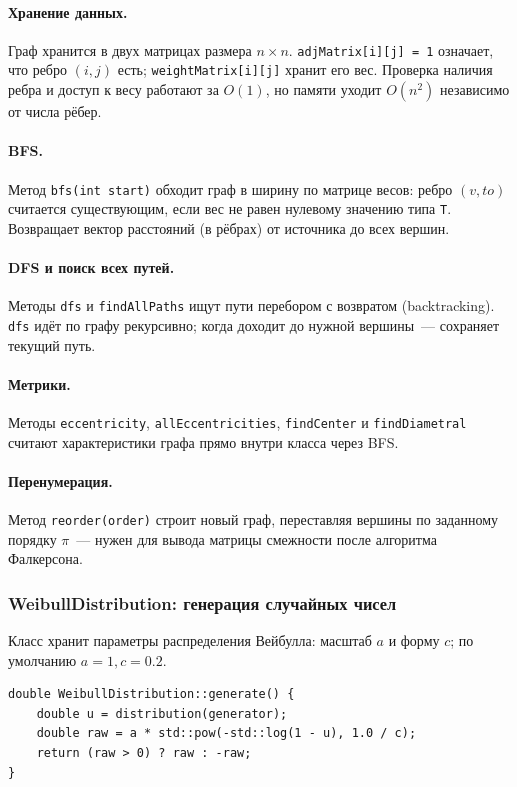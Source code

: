 \paragraph{Хранение данных.} Граф хранится в двух матрицах размера $n \times n$.
\texttt{adjMatrix[i][j] = 1} означает, что ребро $(i, j)$ есть;
\texttt{weightMatrix[i][j]} хранит его вес.
Проверка наличия ребра и доступ к весу работают за $O(1)$, но памяти
уходит $O(n^2)$ независимо от числа рёбер.

\paragraph{BFS.} Метод \texttt{bfs(int start)} обходит граф в ширину
по матрице весов: ребро $(v, to)$ считается существующим, если вес не равен
нулевому значению типа \texttt{T}. Возвращает вектор расстояний (в рёбрах)
от источника до всех вершин.

\paragraph{DFS и поиск всех путей.} Методы \texttt{dfs} и
\texttt{findAllPaths} ищут пути перебором с возвратом (backtracking).
\texttt{dfs} идёт по графу рекурсивно; когда доходит до нужной вершины~---
сохраняет текущий путь.

\paragraph{Метрики.} Методы \texttt{eccentricity}, \texttt{allEccentricities},
\texttt{findCenter} и \texttt{findDiametral} считают характеристики графа
прямо внутри класса через BFS.

\paragraph{Перенумерация.} Метод \texttt{reorder(order)} строит новый граф,
переставляя вершины по заданному порядку $\pi$~--- нужен для вывода матрицы
смежности после алгоритма Фалкерсона.

\subsubsection{WeibullDistribution: генерация случайных чисел}

Класс хранит параметры распределения Вейбулла: масштаб $a$ и форму $c$;
по умолчанию $a = 1, c = 0.2$.

\begin{lstlisting}[style=cstyle, caption={Генерация числа по распределению Вейбулла (weibull.cpp)}]
double WeibullDistribution::generate() {
    double u = distribution(generator);
    double raw = a * std::pow(-std::log(1 - u), 1.0 / c);
    return (raw > 0) ? raw : -raw;
}
\end{lstlisting}

